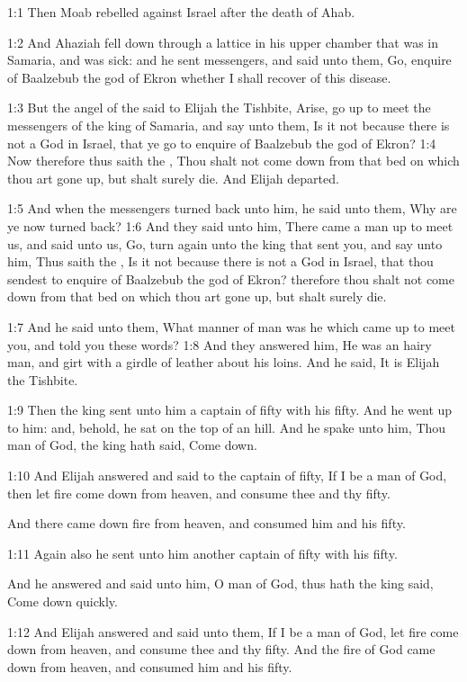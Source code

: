 
1:1 Then Moab rebelled against Israel after the death of Ahab.

1:2 And Ahaziah fell down through a lattice in his upper chamber that was in Samaria, and was sick: and he sent messengers, and said unto them, Go, enquire of Baalzebub the god of Ekron whether I shall recover of this disease.

1:3 But the angel of the \LORD said to Elijah the Tishbite, Arise, go up to meet the messengers of the king of Samaria, and say unto them, Is it not because there is not a God in Israel, that ye go to enquire of Baalzebub the god of Ekron?  1:4 Now therefore thus saith the \LORD, Thou shalt not come down from that bed on which thou art gone up, but shalt surely die. And Elijah departed.

1:5 And when the messengers turned back unto him, he said unto them, Why are ye now turned back?  1:6 And they said unto him, There came a man up to meet us, and said unto us, Go, turn again unto the king that sent you, and say unto him, Thus saith the \LORD, Is it not because there is not a God in Israel, that thou sendest to enquire of Baalzebub the god of Ekron? therefore thou shalt not come down from that bed on which thou art gone up, but shalt surely die.

1:7 And he said unto them, What manner of man was he which came up to meet you, and told you these words?  1:8 And they answered him, He was an hairy man, and girt with a girdle of leather about his loins. And he said, It is Elijah the Tishbite.

1:9 Then the king sent unto him a captain of fifty with his fifty. And he went up to him: and, behold, he sat on the top of an hill. And he spake unto him, Thou man of God, the king hath said, Come down.

1:10 And Elijah answered and said to the captain of fifty, If I be a man of God, then let fire come down from heaven, and consume thee and thy fifty.

And there came down fire from heaven, and consumed him and his fifty.

1:11 Again also he sent unto him another captain of fifty with his fifty.

And he answered and said unto him, O man of God, thus hath the king said, Come down quickly.

1:12 And Elijah answered and said unto them, If I be a man of God, let fire come down from heaven, and consume thee and thy fifty. And the fire of God came down from heaven, and consumed him and his fifty.

